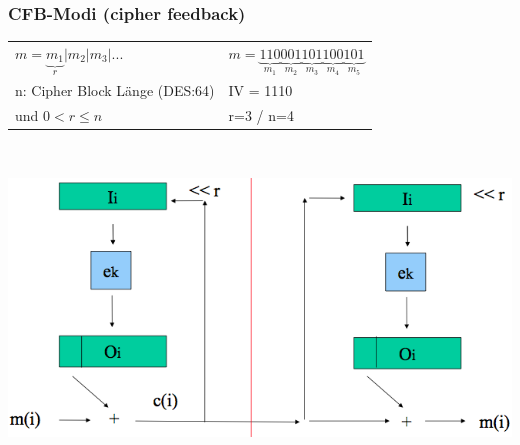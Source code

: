 \documentclass[10pt]{article}
\begin{document}
\subsubsection{CFB-Modi (cipher feedback)}
\begin{tabular}{p{7.5cm} l}
	$m= \underbrace{m_1}_{r} | m_2 | m_3 | ...$ & $m=\underbrace{110}_{m_1} \underbrace{001}_{m_2} \underbrace{101}_{m_3} \underbrace{100}_{m_4} \underbrace{101}_{m_5}$ \\
	n: Cipher Block Länge (DES:64) & {\color{red} IV = 1110} \\
	{\color{red} und $0 < r \leqslant n$} & {\color{red} r=3} / n=4 \\
\end{tabular} \\
\begin{center}
	\includegraphics[scale=0.25]{cfb-encryption.png}
\end{center}

\newpage


\end{document}
